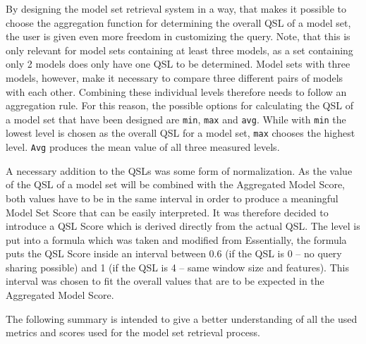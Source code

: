 By designing the model set retrieval system in a way, that makes it possible to choose the aggregation function for determining the overall QSL of a model set, the user is given even more freedom in customizing the query. Note, that this is only relevant for model sets containing at least three models, as a set containing only 2 models does only have one QSL to be determined. Model sets with three models, however, make it necessary to compare three different pairs of models with each other.%
Combining these individual levels therefore needs to follow an aggregation rule. For this reason, the possible options for calculating the QSL of a model set that have been designed are \texttt{min}, \texttt{max} and \texttt{avg}. While with \texttt{min} the lowest level is chosen as the overall QSL for a model set, \texttt{max} chooses the highest level. \texttt{Avg} produces the mean value of all three measured levels.

A necessary addition to the QSLs was some form of normalization. As the value of the QSL of a model set will be combined with the Aggregated Model Score, both values have to be in the same interval in order to produce a meaningful Model Set Score that can be easily interpreted. It was therefore decided to introduce a QSL Score which is derived directly from the actual QSL. The level is put into a formula which was taken and modified from %
Essentially, the formula puts the QSL Score inside an interval between 0.6 (if the QSL is 0 – no query sharing possible) and 1 (if the QSL is 4 – same window size and features). This interval was chosen to fit the overall values that are to be expected in the Aggregated Model Score. 

The following summary is intended to give a better understanding of all the used metrics and scores used for the model set retrieval process.

